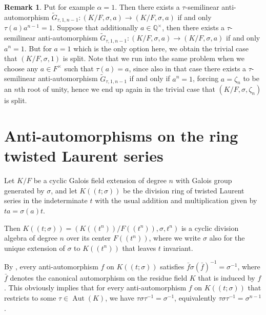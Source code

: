 \documentclass{amsart}
\theoremstyle{plain}
\theoremstyle{definition}
\newtheorem{remark}[theorem]{Remark}
\numberwithin{equation}{section}
\numberwithin{figure}{section}
\DeclareMathOperator{\Aut}{Aut}
\begin{document}
\begin{remark}
Put for example $\alpha=1$. Then there exists  a $\tau$-semilinear anti-automorphism $\widetilde G_{\tau,1,n-1}: (K/F,\sigma,a)\to (K/F,\sigma,a)$ if and only $\tau(a)a^{n-1}=1.$
   Suppose that additionally  $a\in \mathbb{Q}^\times$, then  there exists  a $\tau$-semilinear anti-automorphism
 $\widetilde G_{\tau,1,n-1}: (K/F,\sigma,a)\to (K/F,\sigma,a)$
  if and only $a^{n}=1.$
   But for $a=1$ which is the only option here, we  obtain the trivial case that $(K/F,\sigma,1)$ is split. Note that we run into the same problem when we choose any $a\in F^\times$ such that $\tau(a)=a$, since also in that case  there exists  a $\tau$-semilinear anti-automorphism
 $\widetilde G_{\tau,1,n-1}$ if and only if $a^n=1$, forcing $a=\zeta_n$ to be an $n$th root of unity, hence we end up again in the trivial case that $(K/F,\sigma,\zeta_n)$ is split.
\end{remark}

\section{Anti-automorphisms on the ring  twisted Laurent series} \label{sec:Laurent}


Let $K/F$ be a cyclic Galois field extension of degree $n$ with Galois group generated by $\sigma$, and let $K((t;\sigma))$ be the division ring of twisted Laurent series in the indeterminate $t$ with the usual addition and multiplication given by $ta=\sigma(a)t$.

Then $K((t;\sigma))=(K((t^n))/F((t^n)),\sigma, t^n)$ is a cyclic division algebra  of degree $n$ over its center $F((t^n))$, where we write $\sigma$ also for the unique extension of $\sigma$ to $K((t^n))$ that leaves $t$ invariant.


By \cite[Proposition 4.3]{MST}, every anti-automorphism $f$ on $K((t;\sigma))$ satisfies  $\bar f \sigma (\bar f)^{-1}=\sigma^{-1}$, where $\bar f$ denotes the canonical automorphism on the residue field $K$ that is induced by $f$.
This obviously implies that for every anti-automorphism $f$ on $K((t;\sigma))$ that restricts to some $\tau\in\Aut(K)$, we have  $\tau \sigma \tau^{-1}=\sigma^{-1}$, equivalently $\tau \sigma \tau^{-1}=\sigma^{n-1}$.
\end{document}
